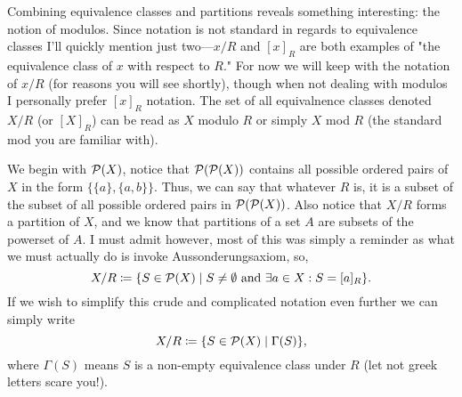 \documentclass{report}
\begin{document}

Combining equivalence classes and partitions reveals something interesting: the notion of modulos. Since notation is not standard in regards to equivalence classes I'll quickly mention just two---\( x / R \) and \( [x]_R \) are both examples of "the equivalence class of \( x \) with respect to \( R \)." For now we will keep with the notation of \( x / R \) (for reasons you will see shortly), though when not dealing with modulos I personally prefer \( [x]_R \) notation. The set of all equivalnence classes denoted \( X / R \) (or \( [X]_R \)) can be read as \( X \) modulo \( R \) or simply \( X \) mod \( R \) (the standard mod you are familiar with). 

\sol We begin with \( \mathcal{P}(X) \), notice that \( \mathcal{P}(\mathcal{P}(X)) \) contains all possible ordered pairs of \( X \) in the form \( \{\{a\},\{a,b\}    \}   \). Thus, we can say that whatever \( R \) is, it is a subset of the subset of all possible ordered pairs in \( \mathcal{P}(\mathcal{P}(X)) \). Also notice that \( X / R \) forms a partition of \( X \), and we know that partitions of a set \( A \) are subsets of the powerset of \( A \). I must admit however, most of this was simply a reminder as what we must actually do is invoke Aussonderungsaxiom, so, \[ X / R \coloneqq \{S \in \mathcal{P}(X) \mid  S\neq \emptyset \text{ and } \exists a \in  X : S=[a]_R \}  .\] If we wish to simplify this crude and complicated notation even further we can simply write \[ X / R \coloneqq  \{S \in  \mathcal{P}(X) \mid  \Gamma (S)\}   ,\] where \( \Gamma (S) \) means \( S \) is a non-empty equivalence class under \( R \) (let not greek letters scare you!). 
\end{document}

